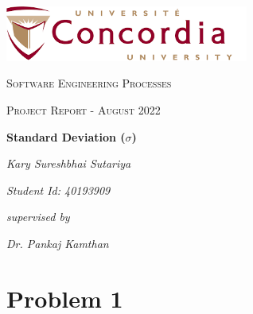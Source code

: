 \documentclass{scrartcl}
\begin{document}
\begin{titlepage}
	\centering
	\includegraphics[width=0.6\textwidth]{Graphics/Concordia.png}\par
	\vspace{2cm}
	
	{\scshape\LARGE Software Engineering Processes \par}      
	\vspace{1cm}
	{\scshape\Large Project Report - August 2022\par}
	\vfill
	
	{\huge\bfseries Standard Deviation ($\sigma$)\par}
	\vspace{0.75cm}
	
	{\Large\itshape Kary Sureshbhai Sutariya}\par
	\vspace{0.75cm}
	{\Large\itshape Student Id: 40193909}\par
	\vspace{1.5cm}

	\vfill
	{\Large\itshape supervised by}\par
	\vspace{0.5cm}

	{\Large\itshape Dr. Pankaj Kamthan}\par
	\vspace{1.5cm}
	 


	\vfill
\end{titlepage}

\newpage

\singlespacing


\section{Problem 1}
\end{document}
